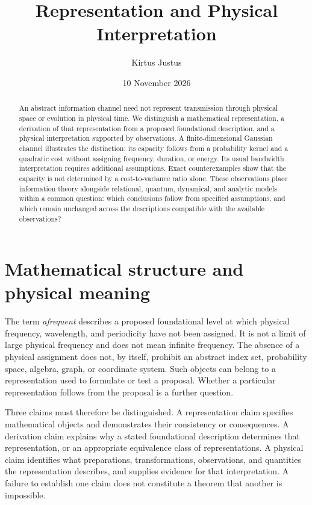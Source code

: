 \documentclass{article}
\title{Representation and Physical Interpretation}
\author{Kirtus Justus}
\date{10 November 2026}
\begin{document}
\maketitle
\begin{abstract}
An abstract information channel need not represent transmission through physical space or evolution in physical time. We distinguish a mathematical representation, a derivation of that representation from a proposed foundational description, and a physical interpretation supported by observations. A finite-dimensional Gaussian channel illustrates the distinction: its capacity follows from a probability kernel and a quadratic cost without assigning frequency, duration, or energy. Its usual bandwidth interpretation requires additional assumptions. Exact counterexamples show that the capacity is not determined by a cost-to-variance ratio alone. These observations place information theory alongside relational, quantum, dynamical, and analytic models within a common question: which conclusions follow from specified assumptions, and which remain unchanged across the descriptions compatible with the available observations?
\end{abstract}

\section{Mathematical structure and physical meaning}
The term \emph{afrequent} describes a proposed foundational level at which physical frequency, wavelength, and periodicity have not been assigned. It is not a limit of large physical frequency and does not mean infinite frequency. The absence of a physical assignment does not, by itself, prohibit an abstract index set, probability space, algebra, graph, or coordinate system. Such objects can belong to a representation used to formulate or test a proposal. Whether a particular representation follows from the proposal is a further question.

Three claims must therefore be distinguished. A representation claim specifies mathematical objects and demonstrates their consistency or consequences. A derivation claim explains why a stated foundational description determines that representation, or an appropriate equivalence class of representations. A physical claim identifies what preparations, transformations, observations, and quantities the representation describes, and supplies evidence for that interpretation. A failure to establish one claim does not constitute a theorem that another is impossible.
\end{document}
